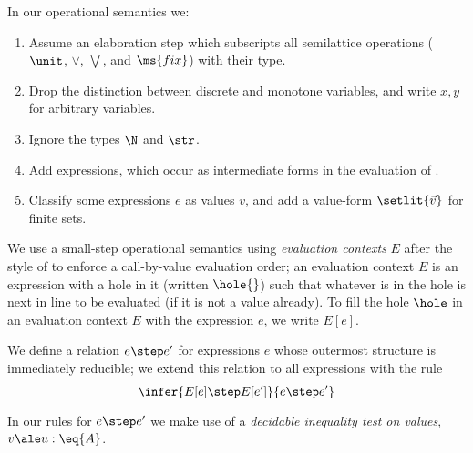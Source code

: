 In our operational semantics we:
\begin{enumerate}
\item Assume an elaboration step which subscripts all semilattice operations
  ($\unit$, $\vee$, $\bigvee$, and $\ms{fix}$) with their type.
\item Drop the distinction between discrete and monotone variables, and write
  $x,y$ for arbitrary variables.
\item Ignore the types $\N$ and $\str$. 
\item Add  expressions, which occur as intermediate forms in the
  evaluation of .
\item Classify some expressions $e$ as values $v$, and add a value-form
  $\setlit{\vec{v}}$ for finite sets.
\end{enumerate}

We use a small-step operational semantics using \emph{evaluation contexts} $E$
after the style of \citet{reduction-contexts} to enforce a call-by-value
evaluation order; an evaluation context $E$ is an expression with a hole in it
(written $\hole{}$) such that whatever is in the hole is next in line to be
evaluated (if it is not a value already). To fill the hole $\hole$ in an
evaluation context $E$ with the expression $e$, we write $E[e]$.

We define a relation $e \step e'$ for expressions $e$ whose outermost structure
is immediately reducible; we extend this relation to all expressions with the
rule
\[\infer{E[e] \step E[e']}{e \step e'}\]

In our rules for $e \step e'$ we make use of a \emph{decidable inequality test
  on values}, $v \ale u : \eq{A}$.
